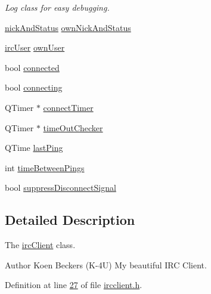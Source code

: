\begin{DoxyCompactItemize}
\begin{DoxyCompactList}\small\item\em Log class for easy debugging. \end{DoxyCompactList}\item 
\hyperlink{structserver_1_1nick_and_status}{nick\-And\-Status} \hyperlink{classserver_1_1irc_client_a9cd79c3e48bbee04bd70596962a83ebc}{own\-Nick\-And\-Status}
\item 
\hyperlink{classserver_1_1irc_user}{irc\-User} \hyperlink{classserver_1_1irc_client_afaf929882986b927133e126a495e3939}{own\-User}
\item 
bool \hyperlink{classserver_1_1irc_client_a04f2961ee284d05ad2ae358661304c17}{connected}
\item 
bool \hyperlink{classserver_1_1irc_client_a3492cfcbd64e62fd28db7ac326d87c78}{connecting}
\item 
Q\-Timer $\ast$ \hyperlink{classserver_1_1irc_client_a3e10145fea758f4283eb8aa14f678c15}{connect\-Timer}
\item 
Q\-Timer $\ast$ \hyperlink{classserver_1_1irc_client_a3ad9869f193bd5218c0fa2bf2c73377f}{time\-Out\-Checker}
\item 
Q\-Time \hyperlink{classserver_1_1irc_client_a522f1dcf5381da46bc18609b69ac6287}{last\-Ping}
\item 
int \hyperlink{classserver_1_1irc_client_a71861748a52a4f4af0fba8652f440841}{time\-Between\-Pings}
\item 
bool \hyperlink{classserver_1_1irc_client_a6aa6b409d9ef795a021d9e7bd44149d6}{suppress\-Disconnect\-Signal}
\end{DoxyCompactItemize}


\subsection{Detailed Description}
The \hyperlink{classserver_1_1irc_client}{irc\-Client} class. 

\begin{DoxyAuthor}{Author}
Koen Beckers (K-\/4\-U) My beautiful I\-R\-C Client. 
\end{DoxyAuthor}


Definition at line \hyperlink{ircclient_8h_source_l00027}{27} of file \hyperlink{ircclient_8h_source}{ircclient.\-h}.



